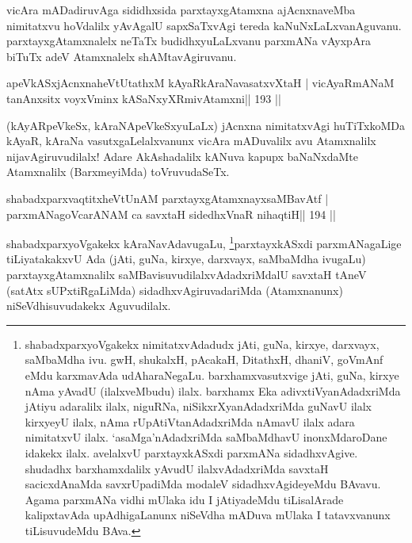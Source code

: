 \begin{artha}
vicAra mADadiruvAga sididhxsida parxtayxgAtamxna ajAcnxnaveMba nimitatxvu hoVdalilx yAvAgalU sapxSaTxvAgi tereda kaNuNxLaLxvanAguvanu. parxtayxgAtamxnalelx neTaTx budidhxyuLaLxvanu parxmANa vAyxpAra biTuTx adeV Atamxnalelx shAMtavAgiruvanu.
\end{artha}

\begin{shl}
apeVkASxjAcnxnaheVtUtathxM kAyaRkAraNavasatxvXtaH |
vicAyaRmANaM tanAnxsitx voyxVminx kASaNxyXRmivA\s\s tamxni\hfill || 193 ||
\end{shl}

\begin{artha}
(kAyARpeVkeSx, kAraNApeVkeSxyuLaLx) jAcnxna nimitatxvAgi huTiTxkoMDa   kAyaR, kAraNa vasutxgaLelalxvanunx vicAra mADuvalilx avu Atamxnalilx   nijavAgiruvudilalx! Adare AkAshadalilx  kANuva kapupx baNaNxdaMte   Atamxnalilx (BarxmeyiMda) toVruvudaSeTx.
\end{artha}


\begin{shl}
shabadxparxvaqtitxheVtUnAM parxtayxgAtamxnayxsaMBavAtf |
parxmANagoVcarANAM ca savxtaH sidedhxVnaR nihaqtiH\hfill || 194 ||
\end{shl}

\begin{artha}
shabadxparxyoVgakekx
kAraNavAdavugaLu, \footnote{shabadxparxyoVgakekx nimitatxvAdadudx
  jAti, guNa, kirxye, darxvayx, saMbaMdha ivu. gwH, shukalxH, pAcakaH,
DitathxH, dhaniV, goVmAnf eMdu karxmavAda udAharaNegaLu.
barxhamxvasutxvige jAti, guNa, kirxye nAma yAvadU (ilalxveMbudu) ilalx.
barxhamx Eka adivxtiVyanAdadxriMda jAtiyu adaralilx ilalx, niguRNa,
niSikxrXyanAdadxriMda guNavU ilalx kirxyeyU ilalx, nAma
rUpAtiVtanAdadxriMda nAmavU ilalx adara nimitatxvU ilalx.
`asaMga'nAdadxriMda saMbaMdhavU inonxMdaroDane idakekx
ilalx. avelalxvU parxtayxkASxdi parxmANa sidadhxvAgive. shudadhx
barxhamxdalilx yAvudU ilalxvAdadxriMda savxtaH sacicxdAnaMda savxrUpadiMda
modaleV sidadhxvAgideyeMdu BAvavu. Agama parxmANa vidhi mUlaka idu I
jAtiyadeMdu tiLisalArade kalipxtavAda upAdhigaLanunx niSeVdha mADuva
mUlaka I tatavxvanunx tiLisuvudeMdu BAva.}parxtayxkASxdi
parxmANagaLige tiLiyatakakxvU Ada (jAti, guNa, kirxye, darxvayx,
saMbaMdha ivugaLu) parxtayxgAtamxnalilx saMBavisuvudilalxvAdadxriMdalU
savxtaH tAneV (satAtx sUPxtiRgaLiMda) sidadhxvAgiruvadariMda
(Atamxnanunx) niSeVdhisuvudakekx Aguvudilalx.
\end{artha}

